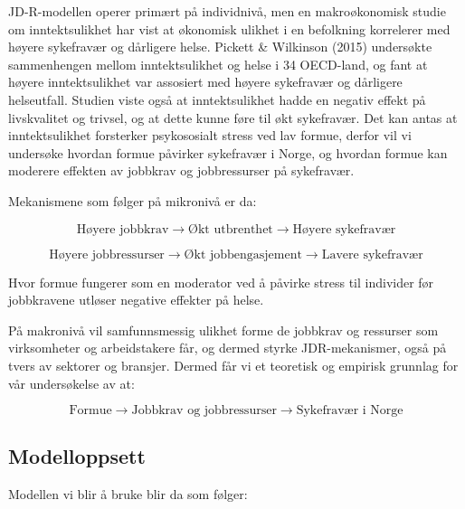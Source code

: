 \documentclass[
  12pt,
  a4paper,
  DIV=11,
  numbers=noendperiod]{scrartcl}
\begin{document}
JD-R-modellen operer primært på individnivå, men en makroøkonomisk
studie om inntektsulikhet har vist at økonomisk ulikhet i en befolkning
korrelerer med høyere sykefravær og dårligere helse. Pickett \&
Wilkinson (2015) undersøkte sammenhengen mellom inntektsulikhet og helse
i 34 OECD-land, og fant at høyere inntektsulikhet var assosiert med
høyere sykefravær og dårligere helseutfall. Studien viste også at
inntektsulikhet hadde en negativ effekt på livskvalitet og trivsel, og
at dette kunne føre til økt sykefravær. Det kan antas at inntektsulikhet
forsterker psykososialt stress ved lav formue, derfor vil vi undersøke
hvordan formue påvirker sykefravær i Norge, og hvordan formue kan
moderere effekten av jobbkrav og jobbressurser på sykefravær.

Mekanismene som følger på mikronivå er da:

\[
\text{Høyere jobbkrav} \rightarrow \text{Økt utbrenthet} \rightarrow \text{Høyere sykefravær}
\]

\[
\text{Høyere jobbressurser} \rightarrow \text{Økt jobbengasjement} \rightarrow \text{Lavere sykefravær}
\]

Hvor formue fungerer som en moderator ved å påvirke stress til individer
før jobbkravene utløser negative effekter på helse.

På makronivå vil samfunnsmessig ulikhet forme de jobbkrav og ressurser
som virksomheter og arbeidstakere får, og dermed styrke JDR-mekanismer,
også på tvers av sektorer og bransjer. Dermed får vi et teoretisk og
empirisk grunnlag for vår undersøkelse av at:

\[
\text{Formue} \rightarrow \text{Jobbkrav og jobbressurser} \rightarrow \text{Sykefravær i Norge}
\]

\subsection{Modelloppsett}\label{modelloppsett}

Modellen vi blir å bruke blir da som følger:
\end{document}
